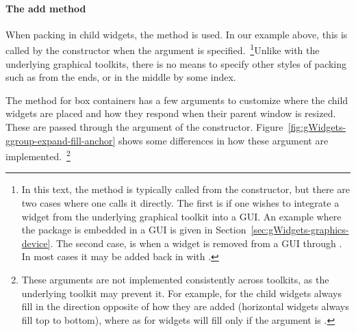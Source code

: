 \paragraph{The add method}
When packing in child widgets, the  method is
used. In our example above, this is called by the
 constructor when the  argument is
specified.~\footnote{In this text, the  method is typically called
from the constructor, but there are two cases where one calls it
directly. The first is if one wishes to integrate a widget from the
underlying graphical toolkit into a  GUI. An example
where the  package is embedded in a GUI is given in 
Section~\ref{sec:gWidgets-graphics-device}. The second case, is when a
widget is removed from a GUI through . In most cases it
may be added back in with .}Unlike with the underlying graphical toolkits, there is no
means to specify other styles of packing such as from the ends, or in
the middle by some index.

The  method for box containers has a few arguments to
customize where the child widgets are placed and how they respond when
their parent window is resized. These are passed through the
  argument of the
constructor. Figure~\ref{fig:gWidgets-ggroup-expand-fill-anchor} shows
some differences in how these argument are
implemented.~\footnote{These arguments are not implemented
  consistently across toolkits, as the underlying toolkit may prevent
  it. For example, for  the child widgets always fill in
  the direction opposite of how they are added (horizontal widgets
  always fill top to bottom), where as for  widgets will
  fill only if the  argument is .}


